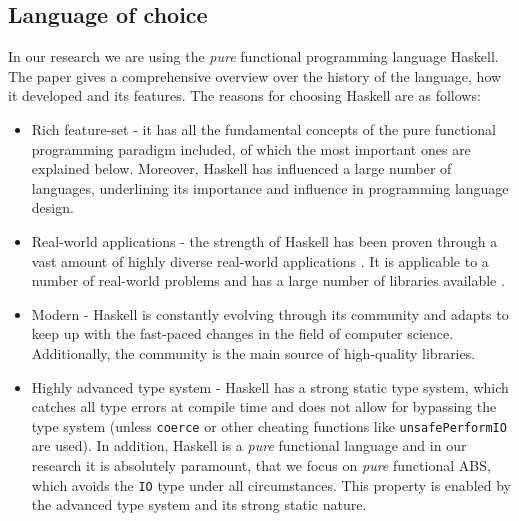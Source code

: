\subsection{Language of choice}
In our research we are using the \textit{pure} functional programming language Haskell. The paper \cite{hudak_history_2007} gives a comprehensive overview over the history of the language, how it developed and its features. The reasons for choosing Haskell are as follows:

\begin{itemize}
	\item Rich feature-set - it has all the fundamental concepts of the pure functional programming paradigm included, of which the most important ones are explained below. Moreover, Haskell has influenced a large number of languages, underlining its importance and influence in programming language design.
	
	\item Real-world applications - the strength of Haskell has been proven through a vast amount of highly diverse real-world applications \cite{hudak_history_2007, hudak_haskell_1994}. It is applicable to a number of real-world problems \cite{osullivan_real_2008} and has a large number of libraries available \cite{haskell_applications}.
	
	\item Modern - Haskell is constantly evolving through its community and adapts to keep up with the fast-paced changes in the field of computer science. Additionally, the community is the main source of high-quality libraries.
	
	\item Highly advanced type system - Haskell has a strong static type system, which catches all type errors at compile time and does not allow for bypassing the type system (unless \texttt{coerce} or other cheating functions like \texttt{unsafePerformIO} are used). In addition, Haskell is a \textit{pure} functional language and in our research it is absolutely paramount, that we focus on \textit{pure} functional ABS, which avoids the \texttt{IO} type under all circumstances. This property is enabled by the advanced type system and its strong static nature.
\end{itemize}

